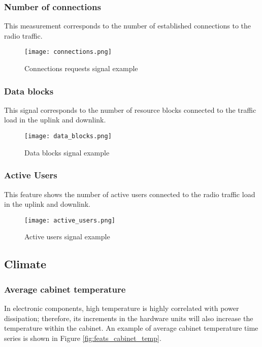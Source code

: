 \subsubsection*{Number of connections}

This measurement corresponds to the number of established connections to the radio traffic.

\begin{figure}[H]
	\centering
	\texttt{[image: connections.png]}
	\caption{Connections requests signal example}
	\label{fig:feats_connections}
\end{figure}

\subsubsection*{Data blocks}

This signal corresponds to the number of resource blocks connected to the traffic load in the uplink and downlink.

\begin{figure}[H]
	\centering
	\texttt{[image: data\_blocks.png]}
	\caption{Data blocks signal example}
	\label{fig:feats_data_blocks}
\end{figure}

\pagebreak
\subsubsection*{Active Users}

This feature shows the number of active users connected to the radio traffic load in the uplink and downlink.

\begin{figure}[H]
	\centering
	\texttt{[image: active\_users.png]}
	\caption{Active users signal example}
	\label{fig:feats_active_users}
\end{figure}


\subsection{Climate}

\subsubsection*{Average cabinet temperature}

In electronic components, high temperature is highly correlated with power dissipation; therefore, its increments in the hardware units will also increase the temperature within the cabinet. An example of average cabinet temperature time series is shown in Figure \ref{fig:feats_cabinet_temp}. 

